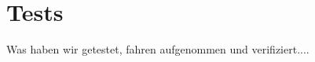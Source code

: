 \chapter{Tests}

Was haben wir getestet, fahren aufgenommen und verifiziert....

  

 
 
 
 
 
 
 
 